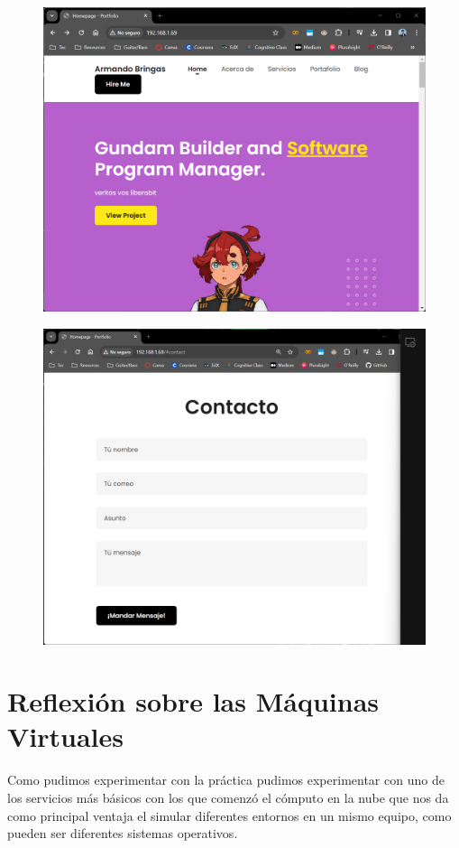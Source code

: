 \documentclass[12pt,a4paper]{article}
\begin{document}
\begin{itemize}
\begin{figure}[H]
    \centering
    \includegraphics[width=.75\linewidth]{M3_Virtualización_y_Contenedores/Tarea_2_Máquina_Virtual_Local/reporte/figuras/7-1_Resultados.png}
    \label{fig:Resultados_1}
\end{figure}


\begin{figure}[H]
    \centering
    \includegraphics[width=.75\linewidth]{M3_Virtualización_y_Contenedores/Tarea_2_Máquina_Virtual_Local/reporte/figuras/7-2_Resultados.png}
    \label{fig:Resultados_2}
\end{figure}


\section{Reflexión sobre las Máquinas Virtuales}

Como pudimos experimentar con la práctica pudimos experimentar con uno de los servicios más básicos con los que comenzó el cómputo en la nube que nos da como principal ventaja el simular diferentes entornos en un mismo equipo, como pueden ser diferentes sistemas operativos. 


\end{itemize}
\end{document}
